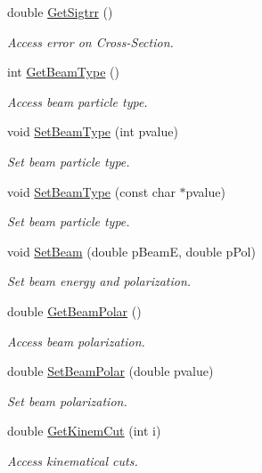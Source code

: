 \begin{DoxyCompactItemize}
double \hyperlink{class_t_djangoh_af888193a486499c7b019b0da80eae760}{Get\+Sigtrr} ()
\begin{DoxyCompactList}\small\item\em Access error on Cross-\/\+Section. \end{DoxyCompactList}\item 
int \hyperlink{class_t_djangoh_a2ed9a38fa1593d5a6a6e2c33b2912d1b}{Get\+Beam\+Type} ()
\begin{DoxyCompactList}\small\item\em Access beam particle type. \end{DoxyCompactList}\item 
void \hyperlink{class_t_djangoh_af93ae6412c07af22bca887cbcbba5082}{Set\+Beam\+Type} (int pvalue)
\begin{DoxyCompactList}\small\item\em Set beam particle type. \end{DoxyCompactList}\item 
void \hyperlink{class_t_djangoh_a37c2f8994175d3181a7f6f5aae5797f1}{Set\+Beam\+Type} (const char $\ast$pvalue)
\begin{DoxyCompactList}\small\item\em Set beam particle type. \end{DoxyCompactList}\item 
void \hyperlink{class_t_djangoh_a6995df5cd413a9e998fe8c0836004363}{Set\+Beam} (double p\+BeamE, double p\+Pol)
\begin{DoxyCompactList}\small\item\em Set beam energy and polarization. \end{DoxyCompactList}\item 
double \hyperlink{class_t_djangoh_a62b52fce9e36c0c7296fc1e519b1b902}{Get\+Beam\+Polar} ()
\begin{DoxyCompactList}\small\item\em Access beam polarization. \end{DoxyCompactList}\item 
double \hyperlink{class_t_djangoh_a34a0415a20f61670164665904eeca25b}{Set\+Beam\+Polar} (double pvalue)
\begin{DoxyCompactList}\small\item\em Set beam polarization. \end{DoxyCompactList}\item 
double \hyperlink{class_t_djangoh_a6baf26c760e0fc2f7bfc802fe7b14093}{Get\+Kinem\+Cut} (int i)
\begin{DoxyCompactList}\small\item\em Access kinematical cuts. \end{DoxyCompactList}\item 

\end{DoxyCompactItemize}
